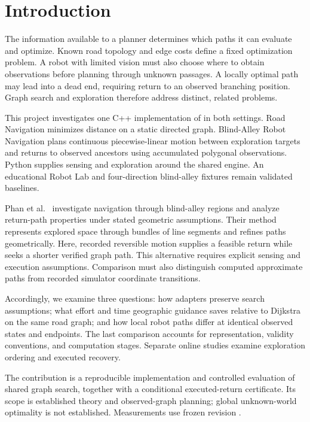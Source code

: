 \section{Introduction}
The information available to a planner determines which paths it can evaluate and optimize. Known road topology and edge costs define a fixed optimization problem. A robot with limited vision must also choose where to obtain observations before planning through unknown passages. A locally optimal path may lead into a dead end, requiring return to an observed branching position. Graph search and exploration therefore address distinct, related problems.

This project investigates one C++ implementation of \astar{} in both settings. Road Navigation minimizes distance on a static directed graph. Blind-Alley Robot Navigation plans continuous piecewise-linear motion between exploration targets and returns to observed ancestors using accumulated polygonal observations. Python supplies sensing and exploration around the shared engine. An educational Robot Lab and four-direction blind-alley fixtures remain validated baselines.

Phan et al.~\cite{phan2026} investigate navigation through blind-alley regions and analyze return-path properties under stated geometric assumptions. Their method represents explored space through bundles of line segments and refines paths geometrically. Here, recorded reversible motion supplies a feasible return while \astar{} seeks a shorter verified graph path. This alternative requires explicit sensing and execution assumptions. Comparison must also distinguish computed approximate paths from recorded simulator coordinate transitions.

Accordingly, we examine three questions: how adapters preserve search assumptions; what effort and time geographic guidance saves relative to Dijkstra on the same road graph; and how local robot paths differ at identical observed states and endpoints. The last comparison accounts for representation, validity conventions, and computation stages. Separate online studies examine exploration ordering and executed recovery.

The contribution is a reproducible implementation and controlled evaluation of shared graph search, together with a conditional executed-return certificate. Its scope is established \astar{} theory and observed-graph planning; global unknown-world optimality is not established. Measurements use frozen revision .
